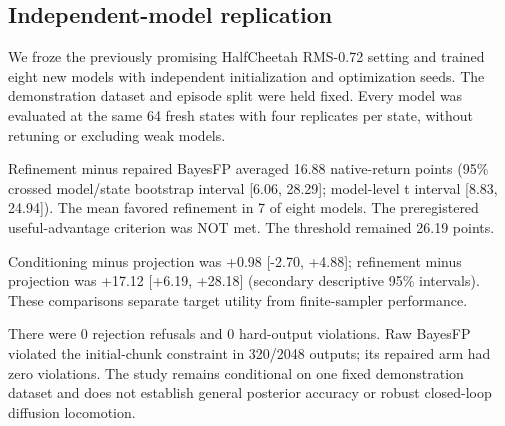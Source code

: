 \subsection{Independent-model replication}
We froze the previously promising HalfCheetah RMS-0.72 setting and trained eight new models with independent initialization and optimization seeds. The demonstration dataset and episode split were held fixed. Every model was evaluated at the same 64 fresh states with four replicates per state, without retuning or excluding weak models.

Refinement minus repaired BayesFP averaged 16.88 native-return points (95\% crossed model/state bootstrap interval [6.06, 28.29]; model-level t interval [8.83, 24.94]). The mean favored refinement in 7 of eight models. The preregistered useful-advantage criterion was NOT met. The threshold remained 26.19 points.

Conditioning minus projection was +0.98 [-2.70, +4.88]; refinement minus projection was +17.12 [+6.19, +28.18] (secondary descriptive 95\% intervals). These comparisons separate target utility from finite-sampler performance.

There were 0 rejection refusals and 0 hard-output violations. Raw BayesFP violated the initial-chunk constraint in 320/2048 outputs; its repaired arm had zero violations. The study remains conditional on one fixed demonstration dataset and does not establish general posterior accuracy or robust closed-loop diffusion locomotion.
